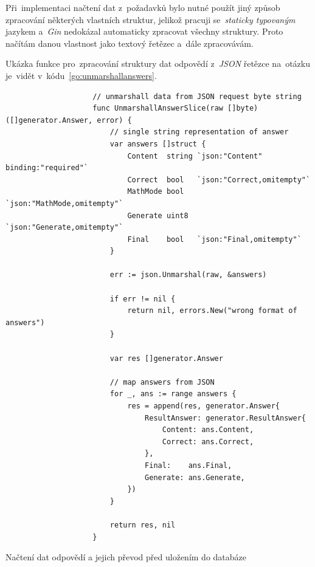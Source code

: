 \documentclass[11pt,a4paper]{report}
\begin{document}
            Při~implementaci načtení dat z~požadavků bylo nutné použít jiný způsob zpracování některých vlastních struktur, jelikož pracuji se~\emph{staticky typovaným} jazykem a~\emph{Gin} nedokázal automaticky zpracovat všechny struktury. Proto načítám danou vlastnost jako textový řetězec a~dále zpracovávám.
            
            Ukázka funkce pro~zpracování struktury dat odpovědí z~\emph{JSON} řetězce na~otázku je~vidět v~kódu~\ref{go:unmarshallanswers}.

            \begin{code}
                \begin{verbatim}
                    // unmarshall data from JSON request byte string
                    func UnmarshallAnswerSlice(raw []byte) ([]generator.Answer, error) {
                    	// single string representation of answer
                    	var answers []struct {
                    		Content  string `json:"Content" binding:"required"`
                    		Correct  bool   `json:"Correct,omitempty"`
                    		MathMode bool   `json:"MathMode,omitempty"`
                    		Generate uint8  `json:"Generate,omitempty"`
                    		Final    bool   `json:"Final,omitempty"`
                    	}
                    
                    	err := json.Unmarshal(raw, &answers)
                    
                    	if err != nil {
                    		return nil, errors.New("wrong format of answers")
                    	}
                    
                    	var res []generator.Answer
                    
                    	// map answers from JSON
                    	for _, ans := range answers {
                    		res = append(res, generator.Answer{
                    			ResultAnswer: generator.ResultAnswer{
                    				Content: ans.Content,
                    				Correct: ans.Correct,
                    			},
                    			Final:    ans.Final,
                    			Generate: ans.Generate,
                    		})
                    	}
                    
                    	return res, nil
                    }
                \end{verbatim}
                \caption{Načtení dat odpovědí a jejich převod před uložením do databáze}
                \label{go:unmarshallanswers}
            \end{code}
\end{document}
